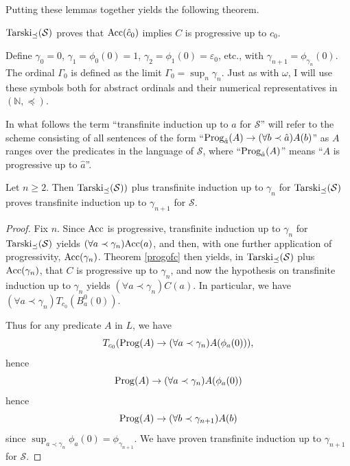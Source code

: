 \documentclass{amsart}
\begin{document}
Putting these lemmas together yields the following theorem.

\begin{theo}\label{progofc}
${\rm Tarski}_{\preceq}(\mathcal{S})$ proves that ${\rm Acc}(\hat{c}_0)$
implies $C$ is progressive up to $c_0$.
\end{theo}

Define $\gamma_0 = 0$, $\gamma_1 = \phi_0(0) = 1$, $\gamma_2 = \phi_1(0) =
\varepsilon_0$, etc., with $\gamma_{n+1} = \phi_{\gamma_n}(0)$. The ordinal $\Gamma_0$
is defined as the limit $\Gamma_0 = \sup_n \gamma_n$. Just as with $\omega$, I will use these
symbols both for abstract ordinals and their numerical representatives in $(\mathbb{N}, \preceq)$.

In what follows the term ``transfinite induction up to $a$ for $\mathcal{S}$'' will refer to the scheme
consisting of all sentences of the form ``${\rm Prog}_{\hat{a}}(A) \to (\forall b \prec \hat{a})A(b)$'' as $A$ ranges
over the predicates in the language of $\mathcal{S}$, where ``${\rm Prog}_{\hat{a}}(A)$'' means ``$A$ is progressive
up to $\hat{a}$''.

\begin{coro}\label{upgamma}
Let $n \geq 2$. Then ${\rm Tarski}_{\preceq}(\mathcal{S}))$ plus transfinite induction up to $\gamma_n$
for ${\rm Tarski}_{\preceq}(\mathcal{S})$ proves transfinite induction up to $\gamma_{n+1}$ for $\mathcal{S}$.
\end{coro}

\begin{proof}
Fix $n$. Since ${\rm Acc}$ is progressive, transfinite induction up to $\gamma_n$ for
${\rm Tarski}_{\preceq}(\mathcal{S})$ yields $(\forall a \prec \gamma_n){\rm Acc}(a)$, and then,
with one further application of progressivity, ${\rm Acc}(\gamma_n)$. Theorem \ref{progofc} then
yields, in ${\rm Tarski}_{\preceq}(\mathcal{S})$ plus ${\rm Acc}(\gamma_n)$, that $C$ is progressive
up to $\gamma_n$, and now the hypothesis on transfinite induction up to $\gamma_n$ yields
$(\forall a \prec \gamma_n)C(a)$. In particular, we have $(\forall a \prec \gamma_n)T_{c_0}(B_a^0(0))$.

Thus for any predicate $A$ in $L$, we have
$$T_{c_0}({\rm Prog}(A) \to (\forall a \prec \gamma_n)A(\phi_a(0))),$$
hence
$${\rm Prog}(A) \to (\forall a \prec \gamma_n)A(\phi_a(0))$$
hence
$${\rm Prog}(A) \to (\forall b \prec \gamma_{n+1})A(b)$$
since $\sup_{a \prec \gamma_n} \phi_a(0) = \phi_{\gamma_{n+1}}$. We have proven transfinite
induction up to $\gamma_{n+1}$ for $\mathcal{S}$.
\end{proof}
\end{document}
